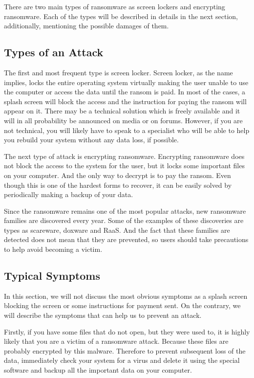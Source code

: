 \documentclass{article}
\begin{document}
	There are two main types of ransomware as screen lockers and encrypting ransomware. Each of the types will be described in details in the next section, additionally, mentioning the possible damages of them.


    
\subsection{Types of an Attack}
   The first and most frequent type is screen locker. Screen locker, as the name implies, locks the entire operating system virtually making the user unable to use the computer or access the data until the ransom is paid. In most of the cases, a splash screen will block the access and the instruction for paying the ransom will appear on it. There may be a technical solution which is freely available and it will in all probability be announced on media or on forums. However, if you are not technical, you will likely have to speak to a specialist who will be able to help you rebuild your system without any data loss, if possible.\cite{cit2}
   
	The next type of attack is encrypting ransomware. Encrypting ransomware does not block the access to the system for the user, but it locks some important files on your computer. And the only way to decrypt is to pay the ransom. Even though this is one of the hardest forms to recover, it can be easily solved by periodically making a backup of your data.
	
	Since the ransomware remains one of the most popular attacks, new ransomware families are discovered every year. Some of the examples of these discoveries are types as scareware, doxware and RaaS. And the fact that these families are detected does not mean that they are prevented, so users should take precautions to help avoid becoming a victim.\cite{cit3}

    
\subsection{Typical Symptoms}
    In this section, we will not discuss the most obvious symptoms as a splash screen blocking the screen or some instructions for payment sent. On the contrary, we will describe the symptoms that can help us to prevent an attack.\cite{cit4}
    
	Firstly, if you have some files that do not open, but they were used to, it is highly likely that you are a victim of a ransomware attack. Because these files are probably encrypted by this malware. Therefore to prevent subsequent loss of the data, immediately check your system for a virus and delete it using the special software and backup all the important data on your computer.
	
\end{document}
